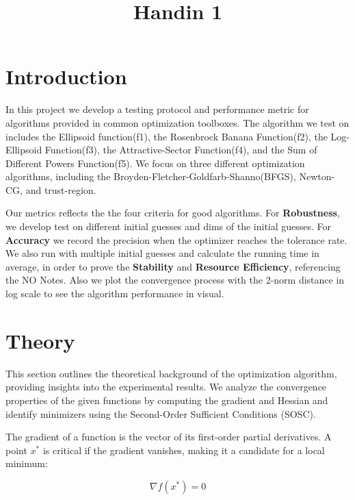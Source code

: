 \documentclass[12pt]{article}
\title{Handin 1}
\begin{document}
\maketitle

\section{Introduction}

In this project we develop a testing protocol and performance metric for algorithms provided in common optimization toolboxes. The algorithm we test on includes the Ellipsoid function(f1), the Rosenbrock Banana Function(f2), the Log-Ellipsoid Function(f3), the Attractive-Sector Function(f4), and the Sum of Different Powers Function(f5). We focus on three different optimization algorithms, including the Broyden-Fletcher-Goldfarb-Shanno(BFGS), Newton-CG, and trust-region.

Our metrics reflects the the four criteria for good algorithms. For \textbf{Robustness}, we develop test on different initial guesses and dims of the initial guesses. For \textbf{Accuracy} we record the precision when the optimizer reaches the tolerance rate. We also run with multiple initial guesses and calculate the running time in average, in order to prove the \textbf{Stability} and \textbf{Resource Efficiency}, referencing the NO Notes. %
Also we plot the convergence process with the 2-norm distance in log scale to see the algorithm performance in visual. 


\section{Theory}

This section outlines the theoretical background of the optimization algorithm, providing insights into the experimental results. We analyze the convergence properties of the given functions by computing the gradient and Hessian and identify minimizers using the Second-Order Sufficient Conditions (SOSC).

The gradient of a function is the vector of its first-order partial derivatives. A point $x^*$ is critical if the gradient vanishes, making it a candidate for a local minimum:

\begin{equation}
\nabla f(x^*) = 0
\label{critical}
\end{equation}
\end{document}
